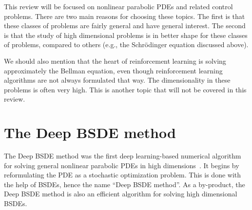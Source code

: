 \documentclass[12pt]{article}
\theoremstyle{definition}
\begin{document}
This review will be focused on nonlinear parabolic PDEs and related control problems.
There are two main reasons for choosing these topics. The first is that these classes of problems are fairly general
and have general interest.  The second is that the study of high dimensional problems  is in better shape for these classes of problems, compared to others (e.g., the Schr\"odinger equation discussed above).

We should also mention that the heart of reinforcement learning is solving approximately the Bellman equation, even though reinforcement learning
algorithms are not always formulated that way. The dimensionality in these problems is often very high. This is another topic that will not be
covered in this review.

%
%




\section{The Deep BSDE method}
The Deep BSDE method was the first deep learning-based  numerical algorithm  for solving general nonlinear parabolic PDEs in high dimensions~\cite{EHanJentzen2017, HanJentzenE2018}.
It begins by reformulating the PDE as a stochastic optimization problem.  This is done with the help of BSDEs, hence the name ``Deep BSDE method''.   As a by-product, the Deep BSDE method is also an efficient algorithm
for solving high dimensional BSDEs.

\label{sec:nonlinear_PDEs}
\end{document}
